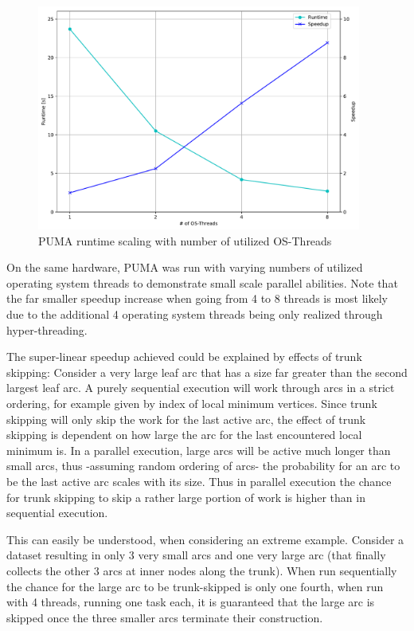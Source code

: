 \documentclass{scrartcl}
\begin{document}
\begin{figure}[h]
\centering
\includegraphics[width=0.95\textwidth]{figures/resscale.pdf}
\caption{PUMA runtime scaling with number of utilized OS-Threads}
\label{fig:resscale}
\end{figure}

On the same hardware, PUMA was run with varying numbers of utilized operating system threads to demonstrate small scale parallel abilities. Note that the far smaller speedup increase when going from 4 to 8 threads is most likely due to the additional 4 operating system threads being only realized through hyper-threading. 

The super-linear speedup achieved could be explained by effects of trunk skipping: Consider a very large leaf arc that has a size far greater than the second largest leaf arc. A purely sequential execution will work through arcs in a strict ordering, for example given by index of local minimum vertices. Since trunk skipping will only skip the work for the last active arc, the effect of trunk skipping is dependent on how large the arc for the last encountered local minimum is. In a parallel execution, large arcs will be active much longer than small arcs, thus -assuming random ordering of arcs- the probability for an arc to be the last active arc scales with its size. Thus in parallel execution the chance for trunk skipping to skip a rather large portion of work is higher than in sequential execution. 

This can easily be understood, when considering an extreme example. Consider a dataset resulting in only 3 very small arcs and one very large arc (that finally collects the other 3 arcs at inner nodes along the trunk). When run sequentially the chance for the large arc to be trunk-skipped is only one fourth, when run with 4 threads, running one task each, it is guaranteed that the large arc is skipped once the three smaller arcs terminate their construction.
\end{document}
